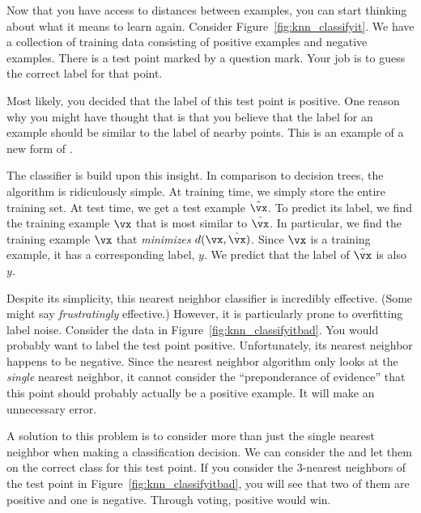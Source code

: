 Now that you have access to distances between examples, you can start
thinking about what it means to learn again.  Consider
Figure~\ref{fig:knn_classifyit}.  We have a collection of training
data consisting of positive examples and negative examples.  There is
a test point marked by a question mark.  Your job is to guess the
correct label for that point.

Most likely, you decided that the label of this test point is
positive.  One reason why you might have thought that is that you
believe that the label for an example should be similar to the label
of nearby points.  This is an example of a new form of
.

The  classifier is build upon this insight.
In comparison to decision trees, the algorithm is ridiculously
simple.  At training time, we simply store the entire training set.
At test time, we get a test example $\hat\vx$.  To predict its label,
we find the training example $\vx$ that is most similar to $\hat\vx$.
In particular, we find the training example $\vx$ that
\emph{minimizes} $d(\vx,\hat\vx)$.  Since $\vx$ is a training example,
it has a corresponding label, $y$.  We predict that the label of
$\hat\vx$ is also $y$.

Despite its simplicity, this nearest neighbor classifier is incredibly
effective.  (Some might say \emph{frustratingly} effective.)  However,
it is particularly prone to overfitting label noise.  Consider the
data in Figure~\ref{fig:knn_classifyitbad}.  You would probably want
to label the test point positive.  Unfortunately, its nearest
neighbor happens to be negative.  Since the nearest neighbor algorithm
only looks at the \emph{single} nearest neighbor, it cannot consider
the ``preponderance of evidence'' that this point should probably
actually be a positive example.  It will make an unnecessary error.



A solution to this problem is to consider more than just the single
nearest neighbor when making a classification decision.  We can
consider the  and
let them  on the correct class for this test point.  If
you consider the $3$-nearest neighbors of the test point in
Figure~\ref{fig:knn_classifyitbad}, you will see that two of them are
positive and one is negative.  Through voting, positive would win.

